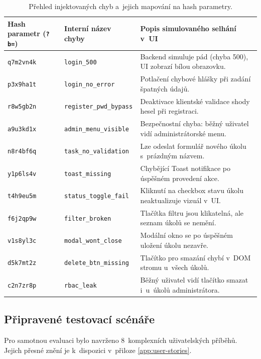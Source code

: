 \documentclass[czech, ing, kiv, he, iso690numb, viewonly]{fasthesis}
\begin{document}
\begin{table}[H]
    \centering
    \begin{tabular}{|l|l|p{4.8cm}|}
        \hline
        \textbf{Hash parametr (\texttt{?b=})} & \textbf{Interní název chyby} & \textbf{Popis simulovaného selhání v~UI} \\ \hline
        \texttt{q7m2vn4k} & \texttt{login\_500} & Backend simuluje pád (chyba 500), UI zobrazí bílou obrazovku. \\ \hline
        \texttt{p3x9ha1t} & \texttt{login\_no\_error} & Potlačení chybové hlášky při zadání špatných údajů. \\ \hline
        \texttt{r8w5gb2n} & \texttt{register\_pwd\_bypass} & Deaktivace klientské validace shody hesel při registraci. \\ \hline
        \texttt{a9u3kd1x} & \texttt{admin\_menu\_visible} & Bezpečnostní chyba: běžný uživatel vidí administrátorské menu. \\ \hline
        \texttt{n8r4bf6q} & \texttt{task\_no\_validation} & Lze odeslat formulář nového úkolu s~prázdným názvem. \\ \hline
        \texttt{y1p6ls4v} & \texttt{toast\_missing} & Chybějící Toast notifikace po úspěšném provedení akce. \\ \hline
        \texttt{t4h9eu5m} & \texttt{status\_toggle\_fail} & Kliknutí na checkbox stavu úkolu neaktualizuje vizuál v~UI. \\ \hline
        \texttt{f6j2qp9w} & \texttt{filter\_broken} & Tlačítka filtru jsou klikatelná, ale seznam úkolů se nemění. \\ \hline
        \texttt{v1s8yl3c} & \texttt{modal\_wont\_close} & Modální okno se po úspěšném uložení úkolu nezavře. \\ \hline
        \texttt{d5k7mt2z} & \texttt{delete\_btn\_missing} & Tlačítko pro smazání chybí v~DOM stromu u~všech úkolů. \\ \hline
        \texttt{c2n7zr8p} & \texttt{rbac\_leak} & Běžný uživatel vidí tlačítko smazat i~u~úkolů administrátora. \\ \hline
    \end{tabular}
    \caption{Přehled injektovaných chyb a~jejich mapování na hash parametry.}
    \label{tab:bug-injection}
\end{table}

\subsection{Připravené testovací scénáře}
Pro samotnou evaluaci bylo navrženo 8~komplexních uživatelských příběhů.
Jejich přesné znění je k~dispozici v~přiloze \ref{app:user-stories}.
\end{document}
